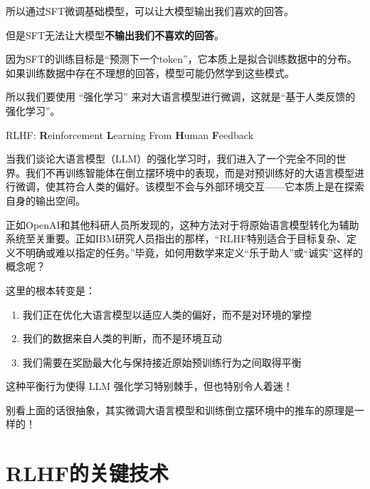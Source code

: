 \documentclass[lang=cn,newtx,10pt,scheme=chinese]{elegantbook}
\begin{document}
所以通过SFT微调基础模型，可以让大模型输出我们喜欢的回答。

\begin{marker}
但是SFT无法让大模型\textbf{不输出我们不喜欢的回答}。
\end{marker}

因为SFT的训练目标是``预测下一个token''，它本质上是拟合训练数据中的分布。如果训练数据中存在不理想的回答，模型可能仍然学到这些模式。

所以我们要使用 ``强化学习'' 来对大语言模型进行微调，这就是``基于人类反馈的强化学习''。

\begin{marker}
RLHF: \textbf{R}einforcement \textbf{L}earning From \textbf{H}uman \textbf{F}eedback
\end{marker}

当我们谈论大语言模型（LLM）的强化学习时，我们进入了一个完全不同的世界。我们不再训练智能体在倒立摆环境中的表现，而是对预训练好的大语言模型进行微调，使其符合人类的偏好。该模型不会与外部环境交互——它本质上是在探索自身的输出空间。

正如OpenAI和其他科研人员所发现的，这种方法对于将原始语言模型转化为辅助系统至关重要。正如IBM研究人员指出的那样，``RLHF特别适合于目标复杂、定义不明确或难以指定的任务。''毕竟，如何用数学来定义``乐于助人''或``诚实''这样的概念呢？

这里的根本转变是：

\begin{enumerate}
\item 我们正在优化大语言模型以适应人类的偏好，而不是对环境的掌控
\item 我们的数据来自人类的判断，而不是环境互动
\item 我们需要在奖励最大化与保持接近原始预训练行为之间取得平衡
\end{enumerate}

这种平衡行为使得 LLM 强化学习特别棘手，但也特别令人着迷！

\begin{marker}
别看上面的话很抽象，其实微调大语言模型和训练倒立摆环境中的推车的原理是一样的！
\end{marker}

\section{RLHF的关键技术}
\end{document}
